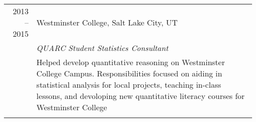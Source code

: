 \documentclass[a4paper,10pt]{report}
\begin{document}
\begin{tabular}{r|p{11cm}}
	\textsc{2013 -- 2015} & Westminster College, Salt Lake City, UT                                                                                                                                         \\
	                      & \emph{QUARC Student Statistics Consultant}                                                                                                                                      \\
	                      & \footnotesize{Helped develop quantitative reasoning on Westminster College Campus.
		Responsibilities focused on aiding in statistical analysis for
		local projects, teaching in-class lessons, and devoloping new
	quantitative literacy courses for Westminster College}                                                                                                                                                  \\
	\multicolumn{2}{c}{}                                                                                                                                                                                    \\
\end{tabular}

\end{document}
